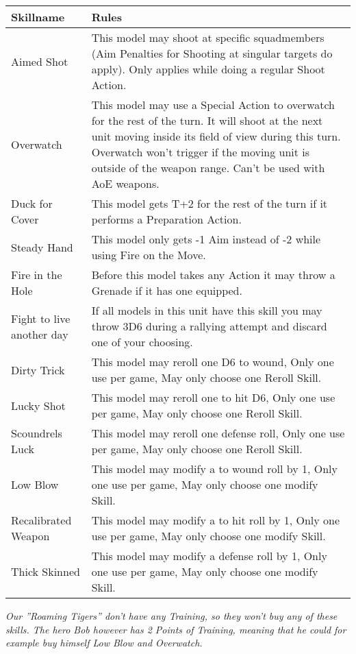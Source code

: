 \documentclass[
	11pt,
	toc=bibliography
	]{article}
\begin{document}
{\renewcommand{\arraystretch}{2}
\begin{longtable}{V{.3\textwidth}| V{.6\textwidth}}
\bf Skillname & \bf Rules\\ 
\hline 
Aimed Shot & This model may shoot at specific squadmembers (Aim Penalties for Shooting at singular targets do apply). Only applies while doing a regular Shoot Action.\\ 
Overwatch & This model may use a Special Action to overwatch for the rest of the turn. It will shoot at the next unit moving inside its field of view during this turn. Overwatch won't trigger if the moving unit is outside of the weapon range. Can't be used with AoE weapons.\\
Duck for Cover & This model gets T+2 for the rest of the turn if it performs a Preparation Action.\\
Steady Hand & This model only gets -1 Aim instead of -2 while using Fire on the Move.\\
Fire in the Hole & Before this model takes any Action it may throw a Grenade if it has one equipped.\\
Fight to live another day & If all models in this unit have this skill you may throw 3D6 during a rallying attempt and discard one of your choosing.\\
Dirty Trick & This model may reroll one D6 to wound, Only one use per game, May only choose one Reroll Skill.\\ 
Lucky Shot & This model may reroll one to hit D6, Only one use per game, May only choose one Reroll Skill.\\ 
Scoundrels Luck & This model may reroll one defense roll, Only one use per game, May only choose one Reroll Skill.\\ 
Low Blow & This model may modify a to wound roll by 1, Only one use per game, May only choose one modify Skill.\\ 
Recalibrated Weapon & This model may modify a to hit roll by 1, Only one use per game, May only choose one modify Skill.\\ 
Thick Skinned & This model may modify a defense roll by 1, Only one use per game, May only choose one modify Skill.\\ 
\end{longtable}}

\textit{Our ''Roaming Tigers'' don't have any Training, so they won't buy any of these skills. The hero Bob however has 2 Points of Training, meaning that he could for example buy himself Low Blow and Overwatch.}
\end{document}
